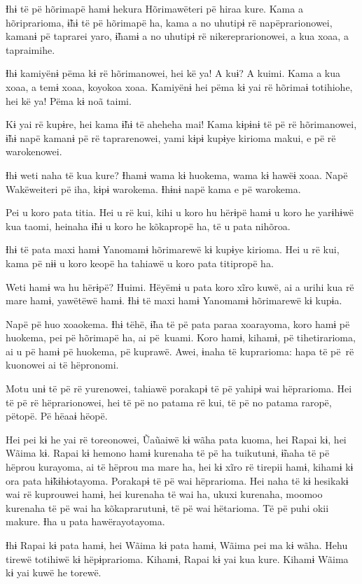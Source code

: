 Ɨhɨ të pë hõrimapë hamɨ hekura Hõrimawëteri pë hiraa kure. Kama a
hõriprarioma, ɨ̃hɨ të pë hõrimapë ha, kama a no uhutipɨ rë
napëprarionowei, kamanɨ pë taprarei yaro, ɨ̃hamɨ a no uhutipɨ rë
nikereprarionowei, a kua xoaa, a tapraimihe. 

Ɨhɨ kamiyënɨ pëma kɨ rë hõrimanowei, hei kë ya! A kuɨ? A kuimi. Kama a
 kua xoaa, a temɨ xoaa, koyokoa xoaa. Kamiyënɨ hei pëma kɨ yai rë hõrimaɨ
 totihiohe, hei kë ya! Pëma kɨ noã taimi.

Kɨ yai rë kupɨre, hei kama ɨ̃hɨ të aheheha mai! Kama kɨpɨnɨ të pë rë
hõrimanowei, ɨ̃hɨ napë kamanɨ pë rë taprarenowei, yami kɨpɨ kupɨye
kirioma makui, e pë rë warokenowei. 

Ɨhɨ weti naha të kua kure? Ɨhamɨ wama kɨ huokema, wama kɨ hawëɨ xoaa.
 Napë Wakëweiteri pë iha, kɨpɨ warokema. Ɨhɨnɨ napë kama e pë warokema. 

Pei u koro pata titia. Hei u rë kui, kihi u koro hu hërɨpë hamɨ u koro
 he yarɨhɨwë kua taomi, heinaha ɨ̃hɨ u koro he kõkapropë ha, të u pata
 nihõroa. 

Ɨhɨ të pata maxi hamɨ Yanomamɨ hõrimarewë kɨ kupɨye kirioma. Hei u rë
kui, kama pë nɨɨ u koro keopë ha tahiawë u koro pata titipropë ha. 

Weti hamɨ wa hu hërɨpë? Huimi. Hëyëmɨ u pata koro xĩro kuwë, ai a urihi
kua rë mare hamɨ, yawëtëwë hamɨ. Ɨhɨ të maxi hamɨ Yanomamɨ hõrimarewë kɨ
kupɨa. 

Napë pë huo xoaokema. Ɨhɨ tëhë, ɨ̃ha të pë pata paraa xoarayoma, koro
 hamɨ pë huokema, pei pë hõrimapë ha, ai pë~kuami. Koro hamɨ, kihamɨ, pë
 tihetirarioma, ai u pë hamɨ pë huokema, pë kuprawë. Awei, ɨnaha të
 kuprarioma: hapa të pë~rë kuonowei ai të hëpronomi.

Motu unɨ të pë rë yurenowei, tahiawë porakapɨ të pë yahipɨ wai
hëprarioma. Hei të pë rë hëprarionowei, hei të pë no patama rë kui, të
pë no patama raropë, pëtopë. Pë hëaaɨ hëopë. 

Hei pei kɨ he yai rë toreonowei, Ũaũaiwë kɨ wãha pata kuoma, hei Rapai
kɨ, hei Wãima kɨ. Rapai kɨ hemono hamɨ kurenaha të pë ha tuikutunɨ,
ɨ̃naha të pë hëprou kurayoma, ai të hëprou ma mare ha, hei kɨ xĩro rë
tirepii hamɨ, kihamɨ kɨ ora pata hɨ̃kɨhɨotayoma. Porakapɨ të pë wai
hëprarioma. Hei naha të kɨ hesikakɨ wai rë kuprouwei hamɨ, hei kurenaha
të wai ha, ukuxi kurenaha, moomoo kurenaha të pë wai ha kõkaprarutunɨ,
të pë wai hëtarioma. Të pë puhi okii makure. Ɨha u pata hawërayotayoma.

Ɨhɨ Rapai kɨ pata hamɨ, hei Wãima kɨ pata hamɨ, Wãima pei ma kɨ wãha.
Hehu tirewë totihiwë kɨ hëpɨprarioma. Kihamɨ, Rapai kɨ yai kua kure.
Kihamɨ Wãima kɨ yai kuwë he torewë. 

